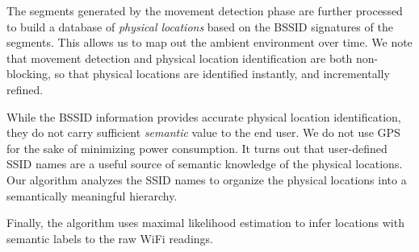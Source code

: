 
The segments generated by the movement detection phase are further processed to
build a database of {\em physical locations} based on the BSSID signatures of
the segments.  This allows us to map out the ambient environment over time.  We
note that movement detection and physical location identification are both
non-blocking, so that physical locations are identified instantly, and
incrementally refined.


While the BSSID information provides accurate physical location identification,
they do not carry sufficient {\em semantic} value to the end user.  We do not use GPS for the sake
of minimizing power consumption.  It turns out that user-defined SSID names are a useful source of semantic knowledge of the physical locations.
Our algorithm analyzes the SSID names to organize the physical locations into a
semantically meaningful hierarchy.


Finally, the algorithm uses maximal likelihood estimation to infer locations
with semantic labels to the raw WiFi readings.


